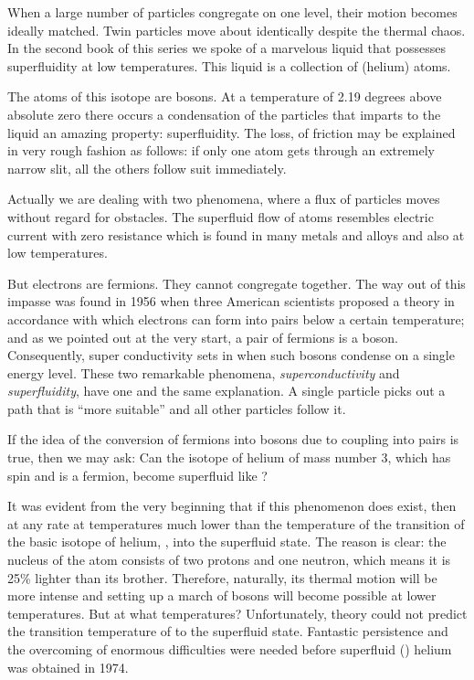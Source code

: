 When a large number of particles congregate on one level, their motion becomes ideally matched. Twin par­ticles move about identically despite the thermal chaos.
In the second book of this series we spoke of a marvel­ous liquid that possesses superfluidity at low tempera­tures. This liquid is a collection of  (helium) atoms.

The atoms of this isotope are bosons. At a temperature of 2.19 degrees above absolute zero there occurs a conden­sation of the particles that imparts to the liquid an amazing property: superfluidity. The loss, of friction may be explained in very rough fashion as follows: if only one atom gets through an extremely narrow slit, all the others follow suit immediately.

Actually we are dealing with two phenomena, where a flux of particles moves without regard for obstacles. The superfluid flow of  atoms resembles electric current with zero resistance which is found in many metals and alloys and also at low temperatures.

But electrons are fermions. They cannot congregate together. The way out of this impasse was found in 1956 when three American scientists proposed a theory in accordance with which electrons can form into pairs below a certain temperature; and as we pointed out at the very start, a pair of fermions is a boson. Consequently, super­ conductivity sets in when such bosons condense on a single energy level. These two remarkable phenomena, \emph{superconductivity} and \emph{superfluidity}, have one and the same explanation. A single particle picks out a path that is ``more suitable'' and all other particles follow it.

If the idea of the conversion of fermions into bosons due to coupling into pairs is true, then we may ask: Can the isotope of helium of mass number 3, which has spin and is a fermion, become superfluid like ?

It was evident from the very beginning that if this phenomenon does exist, then at any rate at temperatures much lower than the temperature of the transition of the basic isotope of helium, , into the superfluid state. The reason is clear: the nucleus of the  atom consists of two protons and one neutron, which means it is 25\% lighter than its brother. Therefore, naturally, its thermal motion will be more intense and setting up a march of bosons will become possible at lower temperatures. But at what temperatures? Unfortunately, theory could not predict the transition temperature of  to the superfluid state. Fantastic persistence and the overcoming of enormous difficulties were needed before superfluid () helium was obtained in 1974.


